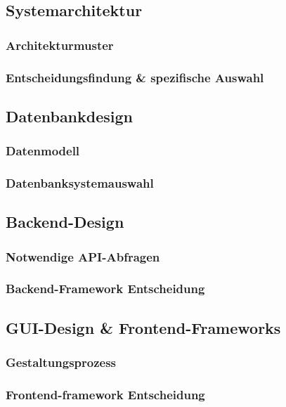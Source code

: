 \documentclass[../main.tex]{subfiles}
\begin{document}
\subsection{Systemarchitektur} %
\subsubsection{Architekturmuster}
\subsubsection{Entscheidungsfindung \& spezifische Auswahl}

\subsection{Datenbankdesign} %
\subsubsection{Datenmodell}
\subsubsection{Datenbanksystemauswahl}

\subsection{Backend-Design} %
\subsubsection{Notwendige API-Abfragen}
\subsubsection{Backend-Framework Entscheidung}

\subsection{GUI-Design \& Frontend-Frameworks} %
\subsubsection{Gestaltungsprozess}
\subsubsection{Frontend-framework Entscheidung}
\end{document}
